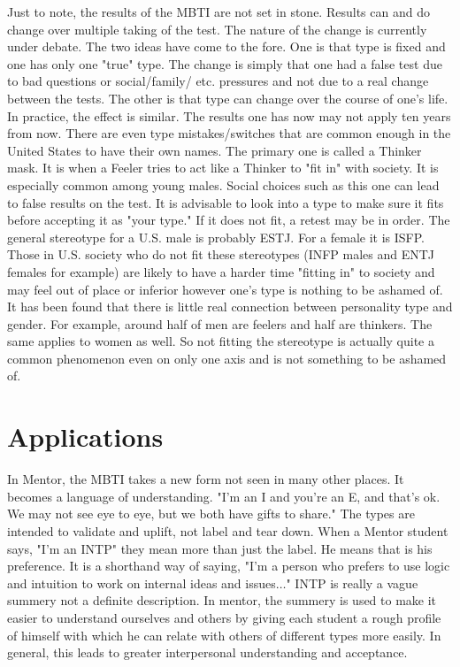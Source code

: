 Just to note, the results of the MBTI are not set in stone. Results can and do change over multiple taking of the test. The nature of the change is currently under debate. The two ideas have come to the fore. One is that type is fixed and one has only one "true" type. The change is simply that one had a false test due to bad questions or social/family/ etc. pressures and not due to a real change between the tests. The other is that type can change over the course of one's life. In practice, the effect is similar. The results one has now may not apply ten years from now. There are even type mistakes/switches that are common enough in the United States to have their own names. The primary one is called a Thinker mask. It is when a Feeler tries to act like a Thinker to "fit in" with society. It is especially common among young males. Social choices such as this one can lead to false results on the test. It is advisable to look into a type to make sure it fits before accepting it as "your type." If it does not fit, a retest may be in order. The general stereotype for a U.S. male is probably ESTJ. For a female it is ISFP. Those in U.S. society who do not fit these stereotypes (INFP males and ENTJ females for example) are likely to have a harder time "fitting in" to society and may feel out of place or inferior however one's type is nothing to be ashamed of. It has been found that there is little real connection between personality type and gender. For example, around half of men are feelers and half are thinkers. The same applies to women as well.  So not fitting the stereotype is actually quite a common phenomenon even on only one axis and is not something to be ashamed of. 

\section{Applications}

In Mentor, the MBTI takes a new form not seen in many other places. It becomes a language of understanding. "I'm an I and you're an E, and that's ok. We may not see eye to eye, but we both have gifts to share." The types are intended to validate and uplift, not label and tear down. When a Mentor student says, "I'm an INTP" they mean more than just the label. He means that is his preference. It is a shorthand way of saying, "I'm a person who prefers to use logic and intuition to work on internal ideas and issues$\ldots$" INTP is really a vague summery not a definite description. In mentor, the summery is used to make it easier to understand ourselves and others by giving each student a rough profile of himself with which he can relate with others of different types more easily. In general, this leads to greater interpersonal understanding and acceptance.

